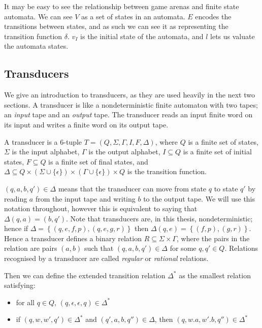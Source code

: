 \documentclass[10pt, a4paper]{report}
\begin{document}
It may be easy to see the relationship between game arenas and finite state
automata. We can see $V$ as a set of states in an automata. $E$ encodes the
transitions between states, and as such we can see it as representing the
transition function $\delta$. $v_I$ is the initial state of the automata, and
$l$ lets us valuate the automata states. 

\subsection{Transducers}
\label{sec:Transducers}

We give an introduction to transducers, as they are used heavily in the next two
sections. A transducer is like a nondeterministic finite automaton with two
tapes; an \emph{input} tape and an \emph{output} tape. The transducer reads
an input finite word on its input and writes a finite word on its output tape.

A transducer is a 6-tuple $T = (Q, \Sigma, \Gamma, I, F, \Delta)$, where $Q$ is
a finite set of states, $\Sigma$ is the input alphabet, $\Gamma$ is the output
alphabet, $I \subseteq Q$ is a finite set of initial states, $F \subseteq Q$ is
a finite set of final states, and $\Delta \subseteq Q \times \left( \Sigma \cup
  \{\epsilon\} \right) \times \left( \Gamma \cup \{\epsilon\} \right) \times Q$
is the transition function.

$(q, a, b, q') \in \Delta$ means that the transducer can move from state $q$ to
state $q'$ by reading $a$ from the input tape and writing $b$ to the output
tape. We will use this notation throughout, however this is equivalent to saying
that $\Delta(q, a) = (b, q')$. Note that transducers are, in this thesis,
nondeterministic; hence if $\Delta = \left\{ (q, e, f, p), (q, e, g, r)
\right\}$ then $\Delta(q, e) = \left\{ (f, p), (g, r) \right\}$. Hence a
transducer defines a binary relation $R \subseteq \Sigma \times \Gamma$, where
the pairs in the relation are pairs $(a, b)$ such that $(q, a, b, q') \in
\Delta$ for some $q, q' \in Q$. Relations recognised by a transducer are
called \emph{regular} or \emph{rational} relations.

Then we can define the extended transition relation $\Delta^\ast$ as the
smallest relation satisfying:

\begin{itemize}
\item for all $q \in Q$, $(q, \epsilon, \epsilon, q) \in \Delta^\ast$
\item if $(q, w, w', q') \in \Delta^\ast$ and $(q', a, b, q'') \in \Delta$, then
  $(q, w . a, w' . b, q'') \in \Delta^\ast$
  
\end{itemize}
\end{document}
